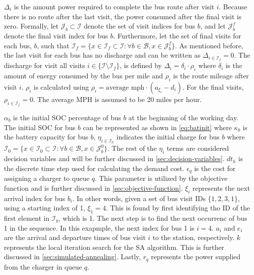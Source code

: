 \documentclass[11pt,a4paper,final]{article}
\newcommand{\Iset}{\mathcal{I}}             %
\newcommand{\Isetinit}{\mathcal{I}_0}       %
\newcommand{\Isetfinal}{\mathcal{I}_f}      %
\newcommand{\Bset}{\mathcal{B}}             %
\newcommand{\Jset}{\mathcal{J}}             %
\begin{document}
\(\Delta_i\) is the amount power required to complete the bus route after visit \(i\). Because there is no route after the
last visit, the power consumed after the final visit is zero. Formally, let \(\Jset_b \subset \Iset\) denote the set of
visit indices for bus \(b\), and let \(\Jset_b^f\) denote the final visit index for bus \(b\). Furthermore, let the set of
final visits for each bus, \(b\), such that \(\Isetfinal = \{ x \in \Isetfinal \subset \Iset : \forall b \in \Bset, x \in
\Jset_b^f \}\). As mentioned before, the last visit for each bus has no discharge and can be written as \(\Delta_{i \in
\Isetfinal} = 0\). The discharge for visit all visits \(i \in \{\Iset \setminus \Isetfinal\}\), is defined by \(\Delta_i =
\delta_i \cdot \rho_i\) where \(\delta_i\) is the amount of energy consumed by the bus per mile and \(\rho_i\) is the route
mileage after visit \(i\). \(\rho_i\) is calculated using \(\rho_i = \text{average mph} \cdot (a_{\xi_i} - d_i)\). For the
final visits, \(\rho_{i \in \Isetfinal} = 0\). The average MPH is assumed to be 20 miles per hour.

\(\alpha_b\) is the initial SOC percentage of bus \(b\) at the beginning of the working day. The initial SOC for bus \(b\) can
be represented as shown in \ref{eq:batinit} where \(\kappa_b\) is the battery capacity for bus \(b\), \(\eta_{i \in \Isetinit}\)
indicates the initial charge for bus \(b\) where \(\Isetinit = \{ x \in \Isetinit \subset \Iset : \forall b \in \Bset, x
\in \Jset_b^0 \}\). The rest of the \(\eta_i\) terms are considered decision variables and will be further discussed in
\ref{sec:decision-variables}. \(dt_h\) is the discrete time step used for calculating the demand cost. \(\epsilon_q\) is the cost
for assigning a charger to queue \(q\). This parameter is utilized by the objective function and is further discussed in
\ref{sec:objective-function}. \(\xi_i\) represents the next arrival index for bus \(b_i\). In other words, given a set of bus
visit IDs \(\{ 1,2,3,1\}\), using a starting index of 1, \(\xi_1 = 4\). This is found by first identifying tho ID of the
first element in \(\Iset_b\), which is 1. The next step is to find the next occurrenc of bus 1 in the sequence. In this
exapmple, the next index for bus 1 is \(i= 4\). \(a_i\) and \(e_i\) are the arrival and departure times of bus visit \(i\) to
the station, respectively. \(k\) represents the local iteration search for the SA algorithm. This is further discussed in
\ref{sec:simulated-annealing}. Lastly, \(r_q\) represents the power supplied from the charger in queue \(q\).
\end{document}

